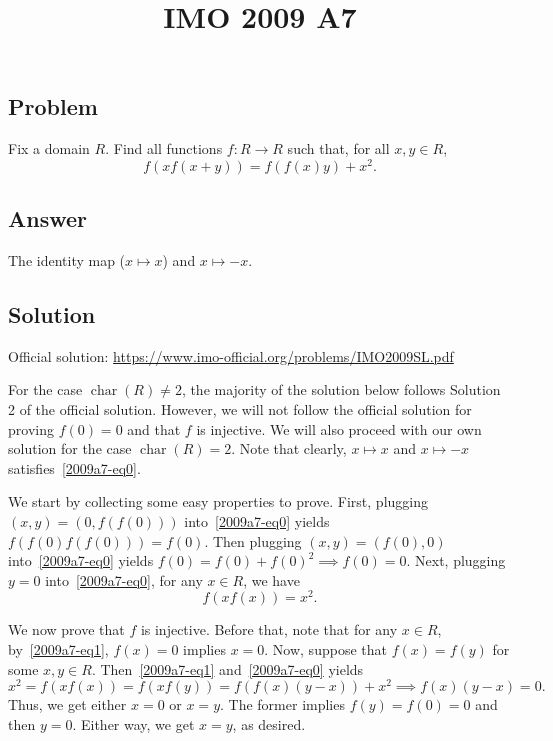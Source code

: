 \documentclass{article}
\title{IMO 2009 A7}
\author{}
\date{}
\DeclareMathOperator{\rchar}{char}
\begin{document}
\maketitle



\subsection*{Problem}

Fix a domain $R$.
Find all functions $f : R \to R$ such that, for all $x, y \in R$,
\[ f(x f(x + y)) = f(f(x) y) + x^2. \tag{*}\label{2009a7-eq0} \]



\subsection*{Answer}

The identity map ($x \mapsto x$) and $x \mapsto -x$.



\subsection*{Solution}

Official solution: \url{https://www.imo-official.org/problems/IMO2009SL.pdf}

For the case $\rchar(R) \neq 2$, the majority of the solution below follows Solution 2 of the official solution.
However, we will not follow the official solution for proving $f(0) = 0$ and that $f$ is injective.
We will also proceed with our own solution for the case $\rchar(R) = 2$.
Note that clearly, $x \mapsto x$ and $x \mapsto -x$ satisfies~\eqref{2009a7-eq0}.

We start by collecting some easy properties to prove.
First, plugging $(x, y) = (0, f(f(0)))$ into~\eqref{2009a7-eq0} yields $f(f(0) f(f(0))) = f(0)$.
Then plugging $(x, y) = (f(0), 0)$ into~\eqref{2009a7-eq0} yields $f(0) = f(0) + f(0)^2 \implies f(0) = 0$.
Next, plugging $y = 0$ into~\eqref{2009a7-eq0}, for any $x \in R$, we have
\[ f(x f(x)) = x^2. \tag{1}\label{2009a7-eq1} \]

We now prove that $f$ is injective.
Before that, note that for any $x \in R$, by~\eqref{2009a7-eq1}, $f(x) = 0$ implies $x = 0$.
Now, suppose that $f(x) = f(y)$ for some $x, y \in R$.
Then~\eqref{2009a7-eq1} and~\eqref{2009a7-eq0} yields
\[ x^2 = f(x f(x)) = f(x f(y)) = f(f(x) (y - x)) + x^2 \implies f(x) (y - x) = 0. \]
Thus, we get either $x = 0$ or $x = y$.
The former implies $f(y) = f(0) = 0$ and then $y = 0$.
Either way, we get $x = y$, as desired.
\end{document}
